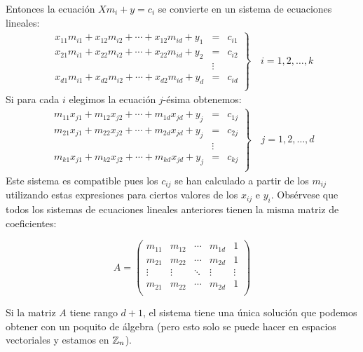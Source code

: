 Entonces la ecuación $Xm_i + y = c_i$ se convierte en un sistema de ecuaciones lineales:
\begin{align*}
    \left.
        \begin{array}{lll}
            x_{11}m_{i1} + x_{12}m_{i2} + \cdots + x_{12}m_{id} + y_1 & = & c_{i1} \\
            x_{21}m_{i1} + x_{22}m_{i2} + \cdots + x_{22}m_{id} + y_2 & = & c_{i2} \\
                                                                    & \vdots &   \\
            x_{d1}m_{i1} + x_{d2}m_{i2} + \cdots + x_{d2}m_{id} + y_d & = & c_{id} \\
        \end{array}
    \right\}\quad i=1,2,\dots,k
\end{align*}
Si para cada $i$ elegimos la ecuación $j$-ésima obtenemos:
\begin{align*}
    \left.
        \begin{array}{lll}
            m_{11}x_{j1} + m_{12}x_{j2} + \cdots + m_{1d}x_{jd} + y_j & = & c_{1j} \\
            m_{21}x_{j1} + m_{22}x_{j2} + \cdots + m_{2d}x_{jd} + y_j & = & c_{2j} \\
                                                                    & \vdots &   \\
            m_{k1}x_{j1} + m_{k2}x_{j2} + \cdots + m_{kd}x_{jd} + y_j & = & c_{kj} \\
        \end{array}
    \right\}\quad j=1,2,\dots,d
\end{align*}
Este sistema es compatible pues los $c_{ij}$ se han calculado a partir de los $m_{ij}$ utilizando estas expresiones para ciertos valores de los $x_{ij}$ e $y_i$. Obsérvese que todos los sistemas de ecuaciones lineales anteriores tienen la misma matriz de coeficientes:

$$A=\begin{pmatrix}
    m_{11} & m_{12} & \cdots & m_{1d} & 1 \\
    m_{21} & m_{22} & \cdots & m_{2d} & 1 \\
    \vdots & \vdots & \ddots & \vdots & \vdots \\
    m_{21} & m_{22} & \cdots & m_{2d} & 1 \\
\end{pmatrix}$$

Si la matriz $A$ tiene rango $d+1$, el sistema tiene una única solución que podemos obtener con un poquito de álgebra (pero esto solo se puede hacer en espacios vectoriales y estamos en $\mathbb{Z}_n$).


